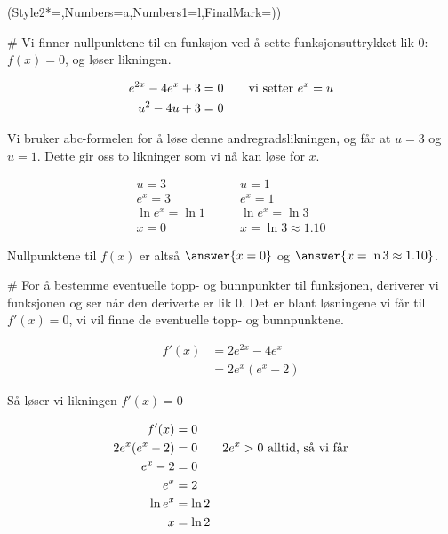 \begin{easylist}[enumerate]
	\ListProperties(Style2*=,Numbers=a,Numbers1=l,FinalMark={)})
	
	# Vi finner nullpunktene til en funksjon ved å sette funksjonsuttrykket lik $0$: $f(x) = 0$, og løser likningen.
	
	\begin{equation*}
	\begin{aligned}
		e^{2x} - 4e^{x} + 3 &= 0 \qquad \textnormal{vi setter $e^x = u$}\\ 
		u^2 - 4u + 3 &= 0\\	
	\end{aligned}
	\end{equation*}
	
	Vi bruker abc-formelen for å løse denne andregradslikningen, og får at $u = 3$ og $u = 1$. Dette gir oss to likninger som vi nå kan løse for $x$.
	
	\begin{equation*}
		\begin{aligned}
		u = 3 & \qquad u = 1 \\
		e^x = 3 & \qquad e^x = 1 \\
		\ln e^x = \ln 1 & \qquad \ln e^x = \ln 3\\
		x = 0 & \qquad x = \ln 3 \approx 1.10
		\end{aligned}
	\end{equation*}
	
	Nullpunktene til $f(x)$ er altså $	\answer{x = 0}$ og $\answer{x = \ln 3 \approx 1.10}$.
	
	# For å bestemme eventuelle topp- og bunnpunkter til funksjonen, deriverer vi funksjonen og ser når den deriverte er lik $0$. Det er blant løsningene vi får til $f'(x) = 0$, vi vil finne de eventuelle topp- og bunnpunktene.
	
	\begin{equation*}
		\begin{aligned}
		f'(x) &= 2e^{2x} - 4e^x \\
		& = 2e^x(e^x - 2)
		\end{aligned}
	\end{equation*}
	
	Så løser vi likningen $f'(x) = 0$
	
	\begin{equation*}
		\begin{aligned}
		f'(x) & = 0 \\
		2e^x(e^x - 2) & = 0 \qquad \textnormal{$2e^x > 0$ alltid, så vi får}\\
		e^x - 2 & = 0 \\
		e^x & = 2 \\
		\ln e^x &=  \ln 2\\
		x & = \ln 2
		\end{aligned}
	\end{equation*}
	

\end{easylist}

